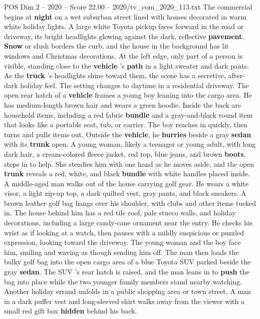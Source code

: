 \begin{textsample}{POS Dim 2 – 2020 – Score 22.00 – 2020/tv\_com\_2020\_113.txt}  \label{ex:f2_pos_045}
The commercial begins at \textbf{night} on a wet suburban street lined with houses decorated in warm white holiday lights.
A large white Toyota pickup faces forward in the road or driveway, its bright headlights glowing against the dark, reflective \textbf{pavement}. \textbf{Snow} or slush borders the curb, and the house in the background has lit windows and Christmas decorations.
At the left edge, only part of a person is visible, standing close to the \textbf{vehicle} ’s \textbf{path} in a light sweater and dark pants.
As the \textbf{truck} ’s headlights shine toward them, the scene has a secretive, after-dark holiday feel.
The setting changes to daytime in a residential driveway.
The open rear hatch of a \textbf{vehicle} frames a young boy leaning into the cargo area.
He has medium-length brown hair and wears a green hoodie.
Inside the back are household items, including a red fabric \textbf{bundle} and a gray-and-black round item that looks like a portable seat, tub, or carrier.
The boy reaches in quickly, then turns and pulls items out.
Outside the \textbf{vehicle}, he \textbf{hurries} beside a gray \textbf{sedan} with its \textbf{trunk} open.
A young woman, likely a teenager or young adult, with long dark hair, a cream-colored fleece jacket, red top, blue jeans, and brown \textbf{boots}, steps in to help.
She steadies him with one hand as he moves aside, and the open \textbf{trunk} reveals a red, white, and black \textbf{bundle} with white handles placed inside.
A middle-aged man walks out of the house carrying golf gear.
He wears a white visor, a light zip-up top, a dark quilted vest, gray pants, and black sneakers.
A brown leather golf bag hangs over his shoulder, with clubs and other items tucked in.
The house behind him has a red tile roof, pale stucco walls, and holiday decorations, including a large candy-cane ornament near the entry.
He checks his wrist as if looking at a watch, then pauses with a mildly suspicious or puzzled expression, looking toward the driveway.
The young woman and the boy face him, smiling and waving as though sending him off.
The man then loads the bulky golf bag into the open cargo area of a blue Toyota SUV parked beside the gray \textbf{sedan}.
The SUV ’s rear hatch is raised, and the man leans in to \textbf{push} the bag into place while the two younger family members stand nearby watching.
Another holiday errand unfolds in a public shopping area or town street.
A man in a dark puffer vest and long-sleeved shirt walks away from the viewer with a small red gift box \textbf{hidden} behind his back.

\end{textsample}
